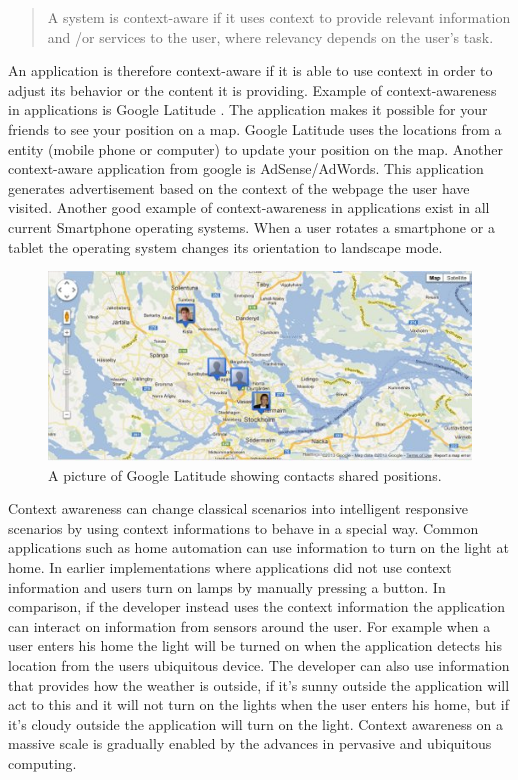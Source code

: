 \begin{quotation}
A system is context-aware if it uses context to provide relevant information and \slash or services to the user, where relevancy depends on the user's task. \cite{dey2001understanding}
\end{quotation}

An application is therefore context-aware if it is able to use context in order to adjust its behavior or the content it is providing. Example of context-awareness in applications is Google Latitude \cite{GoogleLatitude}. The application makes it possible for your friends to see your position on a map. Google Latitude uses the locations from a entity (mobile phone or computer) to update your position on the map. Another context-aware application from google is AdSense/AdWords. This application generates advertisement based on the context of the webpage the user have visited. Another good example of context-awareness in applications exist in all current Smartphone operating systems. When a user rotates a smartphone or a tablet the operating system changes its orientation to landscape mode.

\begin{figure}[t] %
	\centering
    	\includegraphics[scale=0.75]{part_2/context_awareness/latitude_pic.jpg}
		\caption{A picture of Google Latitude showing contacts shared positions.} 
\end{figure}

Context awareness can change classical scenarios into intelligent responsive scenarios by using context informations to behave in a special way. Common applications such as home automation can use information to turn on the light at home. In earlier implementations where applications did not use context information and users turn on lamps by manually pressing a button. In comparison, if the developer instead uses the context information the application can interact on information from sensors around the user. For example when a user enters his home the light will be turned on when the application detects his location from the users ubiquitous device. The developer can also use information that provides how the weather is outside, if it's sunny outside the application will act to this and it will not turn on the lights when the user enters his home, but if it's cloudy outside the application will turn on the light. Context awareness on a massive scale is gradually enabled by the advances in pervasive and ubiquitous computing.

